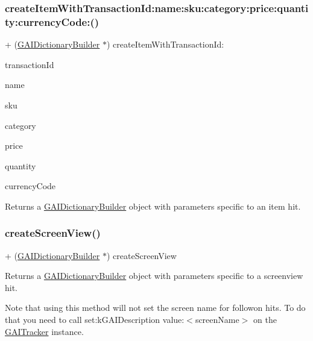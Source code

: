 \subsubsection{\texorpdfstring{create\+Item\+With\+Transaction\+Id\+:name\+:sku\+:category\+:price\+:quantity\+:currency\+Code\+:()}{createItemWithTransactionId:name:sku:category:price:quantity:currencyCode:()}}
{\footnotesize\ttfamily + (\hyperlink{interface_g_a_i_dictionary_builder}{G\+A\+I\+Dictionary\+Builder} $\ast$) create\+Item\+With\+Transaction\+Id\+: \begin{DoxyParamCaption}\item[{(N\+S\+String $\ast$)}]{transaction\+Id }\item[{name:(N\+S\+String $\ast$)}]{name }\item[{sku:(N\+S\+String $\ast$)}]{sku }\item[{category:(N\+S\+String $\ast$)}]{category }\item[{price:(N\+S\+Number $\ast$)}]{price }\item[{quantity:(N\+S\+Number $\ast$)}]{quantity }\item[{currencyCode:(N\+S\+String $\ast$)}]{currency\+Code }\end{DoxyParamCaption}}

Returns a \hyperlink{interface_g_a_i_dictionary_builder}{G\+A\+I\+Dictionary\+Builder} object with parameters specific to an item hit. \mbox{\label{interface_g_a_i_dictionary_builder_ae0fedd6923d4eb6a081b8ad8c301afbe}} 
\subsubsection{\texorpdfstring{create\+Screen\+View()}{createScreenView()}}
{\footnotesize\ttfamily + (\hyperlink{interface_g_a_i_dictionary_builder}{G\+A\+I\+Dictionary\+Builder} $\ast$) create\+Screen\+View \begin{DoxyParamCaption}{ }\end{DoxyParamCaption}}

Returns a \hyperlink{interface_g_a_i_dictionary_builder}{G\+A\+I\+Dictionary\+Builder} object with parameters specific to a screenview hit.

Note that using this method will not set the screen name for followon hits. To do that you need to call set\+:k\+G\+A\+I\+Description value\+:$<$screen\+Name$>$ on the \hyperlink{protocol_g_a_i_tracker-p}{G\+A\+I\+Tracker} instance. \mbox{\label{interface_g_a_i_dictionary_builder_aa9a3fd2d74f815fd607bd31586ebbe52}} 

